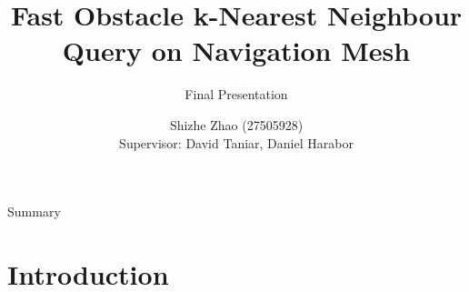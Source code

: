 \documentclass{beamer}
\title[Fast Obstacle k-Nearest Neighbour Query on Navigation Mesh]{
    Fast Obstacle k-Nearest Neighbour Query on Navigation Mesh \\
}
\subtitle {Final Presentation}
\date{}
\author[Shizhe Zhao]{
    Shizhe Zhao (27505928)\\
    Supervisor: David Taniar, Daniel Harabor
}
\begin{document}

\frame{\titlepage}
\section[]{}
\begin{frame}{Summary}
  \tableofcontents
\end{frame}

\section{Introduction}


% 



\end{document}

